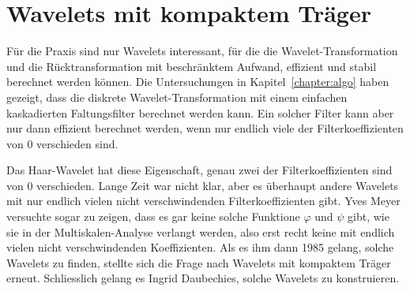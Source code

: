 %
%
%
\chapter{Wavelets mit kompaktem Träger
\label{chapter:kompakt}}
Für die Praxis sind nur Wavelets interessant, für die die
Wavelet-Transformation und die Rücktransformation mit beschränktem Aufwand,
effizient und stabil berechnet werden können.
Die Untersuchungen in Kapitel~\ref{chapter:algo} haben gezeigt, dass 
die diskrete Wavelet-Transformation mit einem einfachen kaskadierten
Faltungsfilter berechnet werden kann.
Ein solcher Filter kann aber nur dann effizient berechnet werden,
wenn nur endlich viele der Filterkoeffizienten von 0 verschieden sind.

Das Haar-Wavelet hat diese Eigenschaft, genau zwei der Filterkoeffizienten
sind von 0 verschieden.
Lange Zeit war nicht klar, aber es überhaupt andere Wavelets mit
nur endlich vielen nicht verschwindenden Filterkoeffizienten gibt.
Yves Meyer versuchte sogar zu zeigen, dass es gar keine solche Funktione
$\varphi$ und $\psi$ gibt, wie sie in der Multiskalen-Analyse verlangt
werden, also erst recht keine mit endlich vielen nicht verschwindenden
Koeffizienten.
Als es ihm dann 1985 gelang, solche Wavelets zu finden, stellte sich
die Frage nach Wavelets mit kompaktem Träger erneut.
Schliesslich gelang es Ingrid Daubechies, solche Wavelets zu konstruieren.







